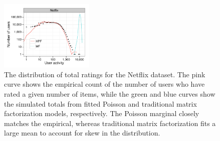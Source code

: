 \begin{figure}[t!]
  \centering
  \includegraphics[width=0.4\textwidth]{figures/user_activity_sim_netflix.pdf}
  \caption{The distribution of total ratings for the Netflix dataset.
    The pink curve shows the empirical count of the number of users
    who have rated a given number of items, while the green and blue
    curves show the simulated totals from fitted Poisson and
    traditional matrix factorization models, respectively. The Poisson
    marginal closely matches the empirical, whereas traditional matrix
    factorization fits a large mean to account for skew in the
    distribution.}
\label{fig:marginals}
\end{figure}





